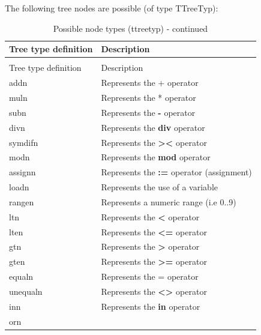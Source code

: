 \documentclass [a4paper,12pt]{article}
\begin{document}
The following tree nodes are possible (of type \textsf{TTreeTyp):}

\begin{longtable}{|l|p{10cm}|}
\caption{Possible node types (ttreetyp)}\label{tab6}\\
\hline
Tree type definition& Description \\
\hline
\endfirsthead
\caption{Possible node types (ttreetyp) - continued}\\
\hline
\hline
Tree type definition&
Description \\
\hline
\endhead
\hline
\endfoot
\textsf{addn}&
        \textsf{Represents the + operator} \\
\textsf{muln}&
        \textsf{Represents the * operator} \\
\textsf{subn}&
        \textsf{Represents the }\textsf{\textbf{-}}\textsf{ operator} \\
\textsf{divn}&
        \textsf{Represents the }\textsf{\textbf{div}}\textsf{ operator} \\
\textsf{symdifn}&
        \textsf{Represents the }\textsf{\textbf{><}}\textsf{ operator} \\
\textsf{modn}&
        \textsf{Represents the }\textsf{\textbf{mod}}\textsf{ operator} \\
\textsf{assignn}&
        \textsf{Represents the }\textsf{\textbf{:=}}\textsf{ operator (assignment)} \\
\textsf{loadn}&
        \textsf{Represents the use of a variable} \\
\textsf{rangen}&
        \textsf{Represents a numeric range (i.e 0..9)} \\
\textsf{ltn}&
        \textsf{Represents the }\textsf{\textbf{<}}\textsf{ operator} \\
\textsf{lten}&
        \textsf{Represents the }\textsf{\textbf{<=}}\textsf{ operator} \\
\textsf{gtn}&
        \textsf{Represents the }\textsf{\textbf{>}}\textsf{ operator} \\
\textsf{gten}&
        \textsf{Represents the }\textsf{\textbf{>=}}\textsf{ operator} \\
\textsf{equaln}&    
        \textsf{Represents the = operator} \\
\textsf{unequaln}&
        \textsf{Represents the }\textsf{\textbf{<>}}\textsf{ operator} \\
\textsf{inn}&
        \textsf{Represents the }\textsf{\textbf{in}}\textsf{ operator} \\
\textsf{orn}&

\end{longtable}
\end{document}
